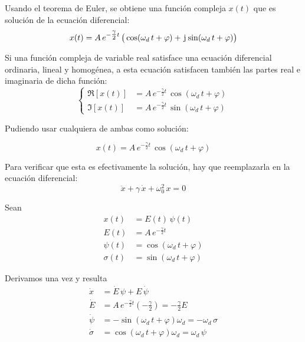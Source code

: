 Usando el teorema de Euler, se obtiene una función compleja $x(t)$ que es solución de la ecuación diferencial:
\[
    x(t) = A \, e^{-\tfrac{\gamma}{2} t} \, \big( \cos(\omega_d \, t + \varphi) + \mkern2mu\mathrm{j}\mkern1mu \sin(\omega_d \, t + \varphi) \big)
\]

Si una función compleja de variable real satisface una ecuación diferencial ordinaria, lineal y homogénea, a esta ecuación satisfacen también las partes real e imaginaria de dicha función:
\[
    \left\{
    \begin{aligned}
        \Re[x(t)] &= A \, e^{-\tfrac{\gamma}{2}t} \, \cos(\omega_d \, t + \varphi)
        \\
        \Im[x(t)] &= A \, e^{-\tfrac{\gamma}{2}t} \, \sin(\omega_d \, t + \varphi)
    \end{aligned}
    \right.
\]

Pudiendo usar cualquiera de ambas como solución:

\begin{mdframed}[style=DefinitionFrame]
    \begin{defn}
    \end{defn}
    \begin{equation*}
        x(t) = A \, e^{-\tfrac{\gamma}{2}t} \, \cos{(\omega_d \, t + \varphi)}
    \end{equation*}
\end{mdframed}

\begin{center}
    \def\svgwidth{0.8\linewidth}
    
\end{center}

Para verificar que esta es efectivamente la solución, hay que reemplazarla en la ecuación diferencial:
\[
    \ddot{x} + \gamma \, \dot{x} + \omega_{0}^{2} \, x = 0
\]

Sean
\begin{align*}
    x(t) &= E(t) \, \psi(t)
    \\
    E(t) &= A \, e^{-\frac{\gamma}{2} t}
    \\
    \psi(t) &= \cos \left( \omega_d \, t + \varphi \right)
    \\
    \sigma(t) &= \sin \left( \omega_d \, t + \varphi \right)
\end{align*}

Derivamos una vez y resulta
\begin{align*}
    \dot{x} &= \dot{E} \, \psi + E \, \dot{\psi}
    \\
    \dot{E} &= A \, e^{-\frac{\gamma}{2} t} \left( - \frac{\gamma}{2} \right)
    = - \frac{\gamma}{2} E
    \\
    \dot{\psi} &= - \sin \left( \omega_d \, t + \varphi \right) \omega_d
    = - \omega_d \, \sigma
    \\
    \dot{\sigma} &= \cos \left( \omega_d \, t + \varphi \right) \omega_d
    = \omega_d \, \psi
\end{align*}


